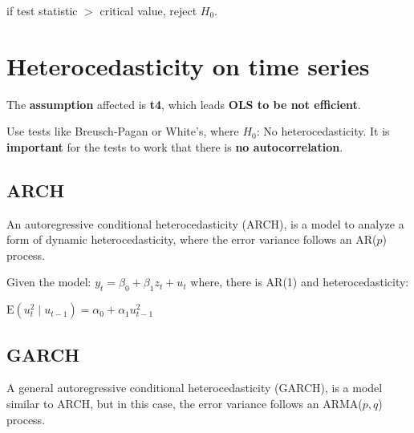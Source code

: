 \documentclass[10pt, a4paper, landscape]{article}
\newcommand{\E}{\mathrm{E}}
\begin{document}
\begin{multicols}{3}
\begin{enumerate}[leftmargin=*]
			if test statistic $>$ critical value, reject $H_0$.
		\end{enumerate}

		\section*{Heterocedasticity on time series}
		
		The \textbf{assumption} affected is \textbf{t4}, which leads \textbf{OLS to be not efficient}.
		
		Use tests like Breusch-Pagan or White's, where $H_{0}$: No heterocedasticity. It is \textbf{important} for the tests to work that there is \textbf{no autocorrelation}.
		
		\subsection*{ARCH}
		
		An autoregressive conditional heterocedasticity (ARCH), is a model to analyze a form of dynamic heterocedasticity, where the error variance follows an AR($p$) process.
		
		Given the model: $y_{t} = \beta_{0} + \beta_{1} z_{t} + u_{t}$ where, there is AR(1) and heterocedasticity:
		
		\begin{center}
			$\E(u^{2}_{t} \mid u_{t - 1}) = \alpha_{0} + \alpha_{1} u^{2}_{t - 1}$
		\end{center}
		
		\subsection*{GARCH}
		
		A general autoregressive conditional heterocedasticity (GARCH), is a model similar to ARCH, but in this case, the error variance follows an ARMA($p, q$) process.
	\end{multicols}
\end{document}
